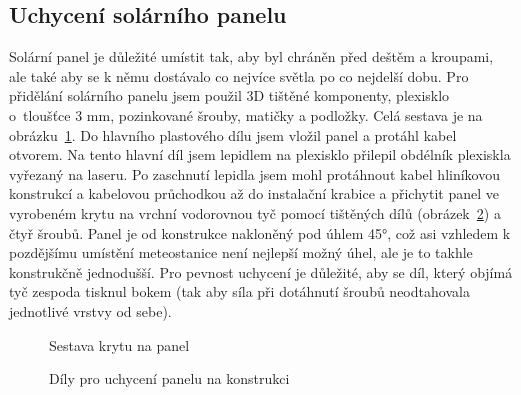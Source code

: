         \subsection{Uchycení solárního panelu}
            Solární panel je důležité umístit tak, aby byl chráněn před deštěm a kroupami, ale také aby se k němu dostávalo co nejvíce světla po co nejdelší dobu. Pro přidělání solárního panelu jsem použil 3D tištěné komponenty, plexisklo o~tloušťce 3 mm, pozinkované šrouby, matičky a podložky. Celá sestava je na obrázku~\ref{SestavaPanel}. Do hlavního plastového dílu jsem vložil panel a protáhl kabel otvorem. Na tento hlavní díl jsem lepidlem na plexisklo přilepil obdélník plexiskla vyřezaný na laseru. Po zaschnutí lepidla jsem mohl protáhnout kabel hliníkovou konstrukcí a kabelovou průchodkou až do instalační krabice a přichytit panel ve vyrobeném krytu na vrchní vodorovnou tyč pomocí tištěných dílů (obrázek~\ref{DilyPanel}) a čtyř šroubů. Panel je od konstrukce nakloněný pod úhlem 45°, což asi vzhledem k pozdějšímu umístění meteostanice není nejlepší možný úhel, ale je to takhle konstrukčně jednodušší. Pro pevnost uchycení je důležité, aby se díl, který objímá tyč zespoda tisknul bokem (tak aby síla při dotáhnutí šroubů neodtahovala jednotlivé vrstvy od sebe).

            \begin{figure}[htb]
            \caption{Sestava krytu na panel}
            \label{SestavaPanel}
            \end{figure}

            \begin{figure}[htb]
            \caption{Díly pro uchycení panelu na konstrukci}
            \label{DilyPanel}
            \end{figure}

        \clearpage

